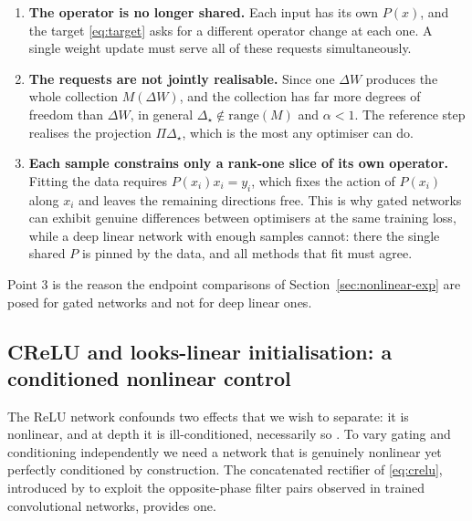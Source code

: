 \documentclass{article} %
\theoremstyle{plain}
\theoremstyle{definition}
\theoremstyle{remark}
\begin{document}
\begin{enumerate}[leftmargin=*,itemsep=2pt,topsep=3pt]
  \item \textbf{The operator is no longer shared.} Each input has its own $P(x)$, and the target
        \eqref{eq:target} asks for a different operator change at each one. A single weight update
        must serve all of these requests simultaneously.
  \item \textbf{The requests are not jointly realisable.} Since one $\Delta W$ produces the whole
        collection $M(\Delta W)$, and the collection has far more degrees of freedom than
        $\Delta W$, in general $\Delta_\star \notin \mathrm{range}(M)$ and $\alpha < 1$. The
        reference step realises the projection $\Pi \Delta_\star$, which is the most any optimiser
        can do.
  \item \textbf{Each sample constrains only a rank-one slice of its own operator.} Fitting the
        data requires $P(x_i) x_i = y_i$, which fixes the action of $P(x_i)$ along $x_i$ and leaves
        the remaining directions free. This is why gated networks can exhibit genuine differences
        between optimisers at the same training loss, while a deep linear network with enough
        samples cannot: there the single shared $P$ is pinned by the data, and all methods that fit
        must agree.
\end{enumerate}

Point 3 is the reason the endpoint comparisons of Section~\ref{sec:nonlinear-exp} are posed for
gated networks and not for deep linear ones.

\subsection{CReLU and looks-linear initialisation: a conditioned nonlinear control}
\label{sec:lookslinear}

The ReLU network confounds two effects that we wish to separate: it is nonlinear, and at depth it
is ill-conditioned, necessarily so \citep{pennington2017resurrecting, haas2026why}. To vary gating and
conditioning independently we need a network that is genuinely nonlinear yet perfectly conditioned
by construction. The concatenated rectifier of \eqref{eq:crelu}, introduced by
\citet{shang2016crelu} to exploit the opposite-phase filter pairs observed in trained
convolutional networks, provides one.
\end{document}

